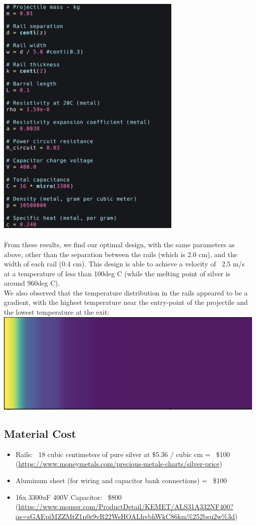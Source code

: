 \documentclass[12pt]{article}
\begin{document}
\includegraphics[width=9cm]{params} \\ \\

From these results, we find our optimal design, with the same parameters as above, other than the separation between the rails (which is 2.0 cm), and the width of each rail (0.4 cm). This design is able to achieve a velocity of ~2.5 m/s at a temperature of less than 100deg C (while the melting point of silver is around 960deg C). \\

We also observed that the temperature distribution in the rails appeared to be a gradient, with the highest temperature near the entry-point of the projectile and the lowest temperature at the exit: \\
\includegraphics[width=15cm]{grad}

\subsection{Material Cost}
\begin{itemize}
    \item Rails: ~18 cubic centimeters of pure silver at \$5.36 / cubic cm = ~\$100 (\url{https://www.moneymetals.com/precious-metals-charts/silver-price})
    \item Aluminum sheet (for wiring and capacitor bank connections) = ~\$100
    \item 16x 3300uF 400V Capacitor: ~\$800 (\url{https://www.mouser.com/ProductDetail/KEMET/ALS31A332NF400?qs=sGAEpiMZZMtZ1n0r9vR22WsHOALhvbhWkC86km%252bsu2w%3d})
\end{itemize}
\end{document}
